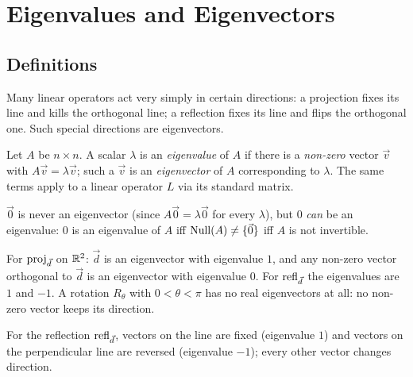 \chapter{Eigenvalues and Eigenvectors}

\section{Definitions}

Many linear operators act very simply in certain directions: a projection fixes its line and kills
the orthogonal line; a reflection fixes its line and flips the orthogonal one. Such special directions are
eigenvectors.

\begin{definition}
Let $A$ be $n\times n$. A scalar $\lambda$ is an \emph{eigenvalue} of $A$ if there is a \emph{non-zero}
vector $\vec v$ with $A\vec v=\lambda\vec v$; such a $\vec v$ is an \emph{eigenvector} of $A$ corresponding
to $\lambda$. The same terms apply to a linear operator $L$ via its standard matrix.
\end{definition}

\begin{important}[Pitfall]
$\vec 0$ is never an eigenvector (since $A\vec 0=\lambda\vec 0$ for every $\lambda$), but $0$ \emph{can} be
an eigenvalue: $0$ is an eigenvalue of $A$ iff $\operatorname{Null}(A)\ne\{\vec0\}$ iff $A$ is not invertible.
\end{important}

\begin{example}
For $\operatorname{proj}_{\vec d}$ on $\mathbb{R}^2$: $\vec d$ is an eigenvector with eigenvalue $1$, and any non-zero vector
orthogonal to $\vec d$ is an eigenvector with eigenvalue $0$. For $\operatorname{refl}_{\vec d}$ the eigenvalues are $1$
and $-1$. A rotation $R_\theta$ with $0<\theta<\pi$ has no real eigenvectors at all: no non-zero vector
keeps its direction.
\end{example}

\begin{center}
\end{center}
For the reflection $\operatorname{refl}_{\vec d}$, vectors on the line are fixed (eigenvalue $1$) and vectors
on the perpendicular line are reversed (eigenvalue $-1$); every other vector changes direction.

